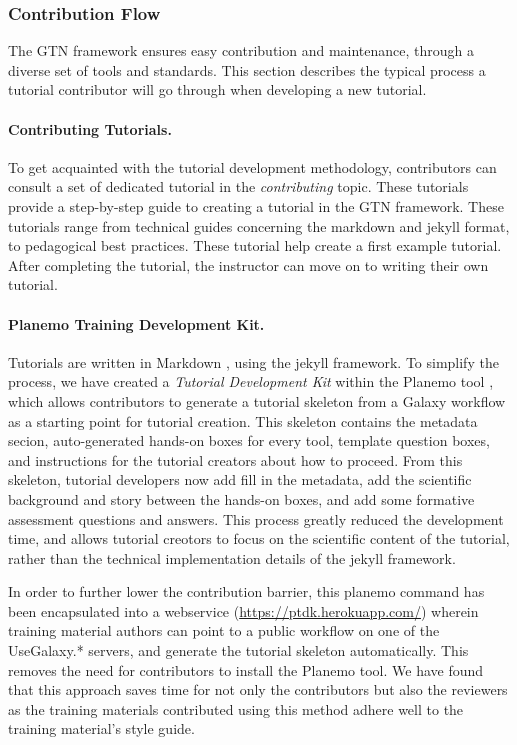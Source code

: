 \documentclass[10pt,letterpaper]{article}
\begin{document}
\subsubsection*{Contribution Flow}

The GTN framework ensures easy contribution and maintenance, through a diverse set of tools and standards.
This section describes the typical process a tutorial contributor will go through when developing a new tutorial.

\paragraph*{Contributing Tutorials.} To get acquainted with the tutorial development methodology, contributors can consult a set of dedicated tutorial in the \emph{contributing} topic. These tutorials provide a step-by-step guide to creating a tutorial in the GTN framework. These tutorials range from technical guides concerning the markdown and jekyll format, to pedagogical best practices. These tutorial help create a first example tutorial. After completing the tutorial, the instructor can move on to writing their own tutorial.

\paragraph*{Planemo Training Development Kit.} Tutorials are written in Markdown \cite{}, using the jekyll \cite{} framework.
To simplify the process, we have created a \emph{Tutorial Development Kit} within the Planemo tool \cite{TODO}, which allows contributors to generate a tutorial skeleton from a Galaxy workflow as a starting point for tutorial creation.
This skeleton contains the metadata secion, auto-generated hands-on boxes for every tool, template question boxes, and instructions for the tutorial creators about how to proceed. From this skeleton, tutorial developers now add fill in the metadata, add the scientific background and story between the hands-on boxes, and add some formative assessment questions and answers.
This process greatly reduced the development time, and allows tutorial creotors to focus on the scientific content of the tutorial, rather than the technical implementation details of the jekyll framework.

In order to further lower the contribution barrier, this planemo command has been encapsulated into a webservice (\url{https://ptdk.herokuapp.com/}) wherein training material authors can point to a public workflow on one of the UseGalaxy.* servers, and generate the tutorial skeleton automatically.
This removes the need for contributors to install the Planemo tool.
 We have found that this approach saves time for not only the contributors but also the reviewers as the training materials contributed using this method adhere well to the training material’s style guide.
\end{document}
